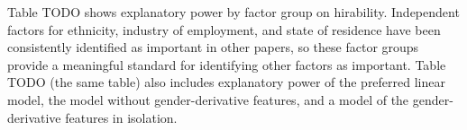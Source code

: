\documentclass[review]{elsarticle}
\begin{document}



Table TODO shows explanatory power by factor group on hirability.
Independent factors for ethnicity, industry of employment, and state of residence
have been consistently identified as important in other papers,
so these factor groups provide a meaningful standard for identifying other factors as important.
Table TODO (the same table) also includes explanatory power of the preferred linear model,
the model without gender-derivative features,
and a model of the gender-derivative features in isolation.



\end{document}
